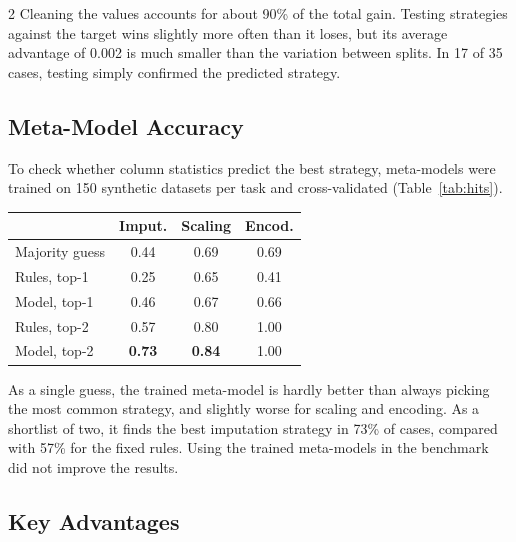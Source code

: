 \documentclass[11pt,a4paper]{article}
\newenvironment{coltable}{\par\medskip\noindent\begin{minipage}{\linewidth}\centering\small}{\end{minipage}\par\medskip}
\begin{document}
\begin{multicols}{2}
Cleaning the values accounts for about 90\% of the total gain. Testing strategies against the target wins slightly more often than it loses, but its average advantage of 0.002 is much smaller than the variation between splits. In 17 of 35 cases, testing simply confirmed the predicted strategy.

\subsection{Meta-Model Accuracy}

To check whether column statistics predict the best strategy, meta-models were trained on 150 synthetic datasets per task and cross-validated (Table~\ref{tab:hits}).

\begin{coltable}
\label{tab:hits}
\setlength{\tabcolsep}{4pt}
\begin{tabular}{lccc}
\toprule
 & \textbf{Imput.} & \textbf{Scaling} & \textbf{Encod.} \\
\midrule
Majority guess & 0.44 & 0.69 & 0.69 \\
Rules, top-1 & 0.25 & 0.65 & 0.41 \\
Model, top-1 & 0.46 & 0.67 & 0.66 \\
Rules, top-2 & 0.57 & 0.80 & 1.00 \\
Model, top-2 & \textbf{0.73} & \textbf{0.84} & 1.00 \\
\bottomrule
\end{tabular}
\end{coltable}

As a single guess, the trained meta-model is hardly better than always picking the most common strategy, and slightly worse for scaling and encoding. As a shortlist of two, it finds the best imputation strategy in 73\% of cases, compared with 57\% for the fixed rules. Using the trained meta-models in the benchmark did not improve the results.

\subsection{Key Advantages}


\end{multicols}
\end{document}
